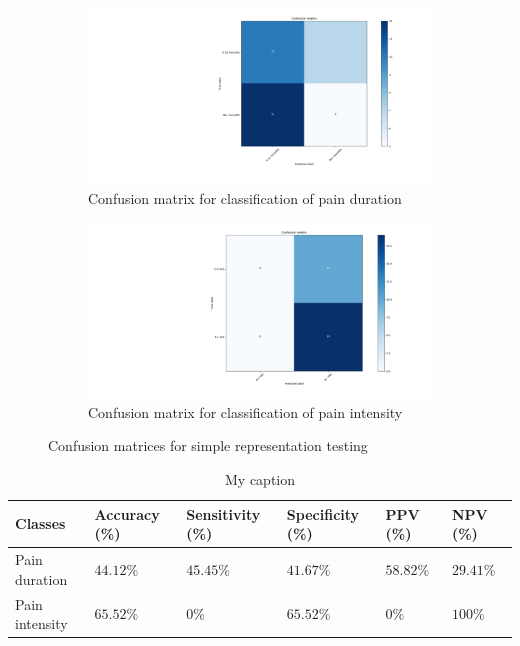 \documentclass[12pt,a4paper]{article}
\begin{document}
\begin{figure}[H]
  \begin{subfigure}[b]{0.45\textwidth}
    \includegraphics[width=\textwidth]{figures/sdura2cla}
    \caption{Confusion matrix for classification of pain duration}
    \label{fig:f1}
  \end{subfigure}
  \hfill
  \begin{subfigure}[b]{0.45\textwidth}
    \includegraphics[width=\textwidth]{figures/spain2cla}
    \caption{Confusion matrix for classification of pain intensity}
    \label{fig:f2}
  \end{subfigure}
  \caption{Confusion matrices for simple representation testing}
\end{figure}


\begin{table}[H]
\centering
\begin{tabular}{|p{2cm}|p{2.2cm}|p{2.2cm}|p{2.2cm}|p{2cm}|p{2cm}|}
\hline
Classes          & Accuracy (\%) & Sensitivity (\%) & Specificity (\%) & PPV (\%) & NPV (\%) \\ \hline
Pain duration &$44.12\%$&$45.45\%$&$41.67\%$&$58.82\%$&$29.41\%$\\ \hline
Pain intensity &$65.52\%$&$0\%$&$65.52\%$&$0\%$&$100\%$ \\ \hline
\end{tabular}
\label{my-label}
\caption{My caption}
\end{table}
\end{document}

